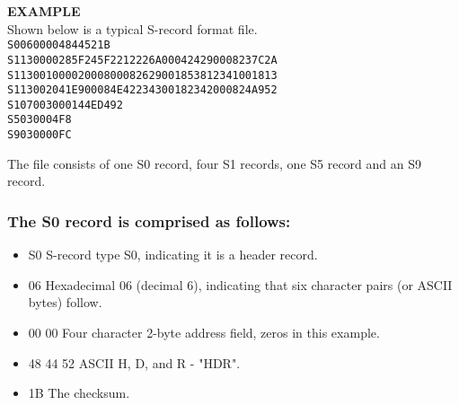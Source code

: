                 \textbf{EXAMPLE}\\
                Shown below is a typical S-record format file.
                    {
                        \usecodefont
                        \verb''\\
                        \verb'S00600004844521B'\\
                        \verb'S1130000285F245F2212226A000424290008237C2A'\\
                        \verb'S11300100002000800082629001853812341001813'\\
                        \verb'S113002041E900084E42234300182342000824A952'\\
                        \verb'S107003000144ED492'\\
                        \verb'S5030004F8'\\
                        \verb'S9030000FC'\\
                    }

                The file consists of one S0 record, four S1 records, one S5 record and
                an S9 record.

                \subsubsection{The S0 record is comprised as follows:}
                    \begin{itemize}
                        \item S0 S-record type S0, indicating it is a header record.
                        \item 06 Hexadecimal 06 (decimal 6), indicating that six character pairs (or ASCII bytes) follow.
                        \item 00 00 Four character 2-byte address field, zeros in this example.
                        \item 48 44 52 ASCII H, D, and R - "HDR".
                        \item 1B The checksum.
                    \end{itemize}

